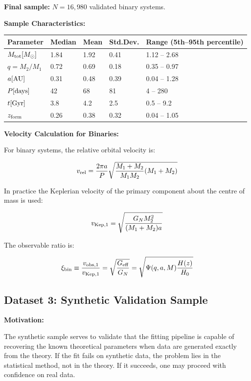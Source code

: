\documentclass[11pt,a4paper]{article}
\begin{document}
\textbf{Final sample:} \(N = 16,980\) validated binary systems.

\textbf{Sample Characteristics:}

\begin{longtable}[]{@{}lllll@{}}
\toprule\noalign{}
Parameter & Median & Mean & Std.Dev. & Range (5th--95th percentile) \\
\midrule\noalign{}
\endhead
\bottomrule\noalign{}
\endlastfoot
\(M_{\rm tot} [M_\odot]\) & 1.84 & 1.92 & 0.41 & 1.12 -- 2.68 \\
\(q = M_2/M_1\) & 0.72 & 0.69 & 0.18 & 0.35 -- 0.97 \\
\(a [\rm AU]\) & 0.31 & 0.48 & 0.39 & 0.04 -- 1.28 \\
\(P [\rm days]\) & 42 & 68 & 81 & 4 -- 280 \\
\(t [{\rm Gyr}]\) & 3.8 & 4.2 & 2.5 & 0.5 -- 9.2 \\
\(z_{\rm form}\) & 0.26 & 0.38 & 0.32 & 0.04 -- 1.05 \\
\end{longtable}

\textbf{Velocity Calculation for Binaries:}

For binary systems, the relative orbital velocity is:

\[v_{\rm rel} = \frac{2\pi a}{P}\sqrt{\frac{M_1 + M_2}{M_1 M_2}(M_1 + M_2)}\]

In practice the Keplerian velocity of the primary component about the
centre of mass is used:

\[v_{\rm Kep,1} = \sqrt{\frac{G_N M_2^2}{(M_1+M_2)a}}\]

The observable ratio is:

\[\xi_{\rm bin} \equiv \frac{v_{\rm obs,1}}{v_{\rm Kep,1}} = \sqrt{\frac{G_{\rm eff}}{G_N}} = \sqrt{\Psi(q,a,M) \frac{H(z)}{H_0}}\]

\hypertarget{dataset-3-synthetic-validation-sample}{%
\subsection{Dataset 3: Synthetic Validation
Sample}\label{dataset-3-synthetic-validation-sample}}

\textbf{Motivation:}

The synthetic sample serves to validate that the fitting pipeline is
capable of recovering the known theoretical parameters when data are
generated exactly from the theory. If the fit fails on synthetic data,
the problem lies in the statistical method, not in the theory. If it
succeeds, one may proceed with confidence on real data.
\end{document}
